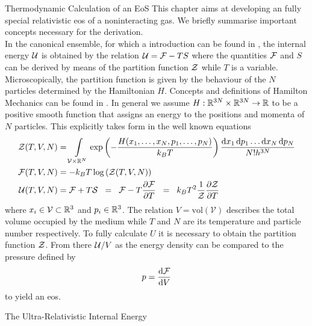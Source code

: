 \begin{section}{Thermodynamic Calculation of an EoS}
This chapter aims at developing an fully special relativistic \ac{eos} of a noninteracting gas. We briefly summarise important concepts necessary for the derivation.\\
In the canonical ensemble, for which a introduction can be found in \cite{fliessbachStatistischePhysikLehrbuch2018}, the internal energy $\mathcal{U}$ is obtained by the relation $\mathcal{U}=\mathcal{F}-TS$ where the quantities $\mathcal{F}$ and $S$ can be derived by means of the partition function $\mathcal{Z}$ while $T$ is a variable.
Microscopically, the partition function is given by the behaviour of the $N$ particles determined by the Hamiltonian $H$.
Concepts and definitions of Hamilton Mechanics can be found in \cite{eschrigTopologyGeometryPhysics2011, fliessbachMechanikLehrbuchZur2020, spivakPhysicsMathematiciansMechanics2010}. 
In general we assume $H:\mathbb{R}^{3N}\times\mathbb{R}^{3N}\rightarrow\mathbb{R}$ to be a positive smooth function that assigns an energy to the positions and momenta of $N$ particles.
This explicitly takes form in the well known equations
\begin{align}
	\mathcal{Z}(T,V,N) 	&= \int\limits_{\mathcal{V}\times\mathbb{R}^N}\exp\left(-\frac{H(x_1,\dots,x_N,p_1,\dots,p_N)}{k_BT}\right)\frac{\mathop{}\!\mathrm{d} x_1\mathop{}\!\mathrm{d} p_1\dots \mathop{}\!\mathrm{d} x_N\mathop{}\!\mathrm{d} p_N}{N!h^{3N}}\\
	\mathcal{F}(T,V,N) 	&= - k_BT\log\left(\mathcal{Z}(T,V,N)\right)\label{2-IntEner-FreeEnerDef}\\
	\mathcal{U}(T,V,N) 	&= \mathcal{F} + T \mathcal{S} \hspace{0.2cm}=\hspace{0.2cm} \mathcal{F} - T\frac{\partial\mathcal{F}}{\partial T} \hspace{0.2cm}=\hspace{0.2cm} k_BT^2\frac{1}{\mathcal{Z}}\frac{\partial\mathcal{Z}}{\partial T}\label{2-IntEner-Def}
\end{align}
where $x_i\in \mathcal{V}\subset\mathbb{R}^3$  and $p_i\in \mathbb{R}^3$. The relation $V=\text{vol}(\mathcal{V})$ describes the total volume occupied by the medium while $T$ and $N$ are its temperature and particle number respectively.
To fully calculate $U$ it is necessary to obtain the partition function $\mathcal{Z}$.
From there $\mathcal{U}/V$ as the energy density can be compared to the pressure defined by
\begin{equation}
	p=\frac{\mathop{}\!\mathrm{d}\mathcal{F}}{\mathop{}\!\mathrm{d} V}
	\label{2-IntEner-pressureDef}
\end{equation}
to yield an \ac{eos}.
%
%
%
\begin{subsection}{The Ultra-Relativistic Internal Energy}

\end{subsection}
\end{section}
